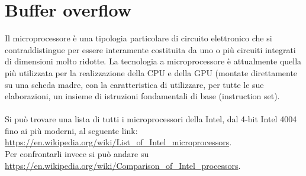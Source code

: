 \documentclass[8pt]{extarticle}
\begin{document}
\section{Buffer overflow}
Il microprocessore è una tipologia particolare di circuito elettronico che si contraddistingue per 
essere interamente costituita da uno o più circuiti integrati di dimensioni molto ridotte. 
La tecnologia a microprocessore è attualmente quella più utilizzata per la realizzazione della CPU e 
della GPU (montate direttamente su una scheda madre, con la caratteristica di utilizzare, per tutte 
le sue elaborazioni, un insieme di istruzioni fondamentali di base (instruction set).\\\\
Si può trovare una lista di tutti i microprocessori della Intel, dal 4-bit Intel 4004 fino ai più 
moderni, al seguente link: \url{https://en.wikipedia.org/wiki/List_of_Intel_microprocessors}. \\
Per confrontarli invece si può andare su \url{https://en.wikipedia.org/wiki/Comparison_of_Intel_processors}.
\end{document}
